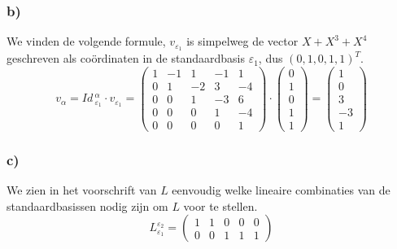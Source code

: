 \documentclass[lineaire_algebra_oplossingen.tex]{subfiles}
\begin{document}
\subsubsection*{b)}
We vinden de volgende formule, $v_{\varepsilon_1}$ is simpelweg de vector $X+X^3+X^4$ geschreven als co\"ordinaten in de standaardbasis $\varepsilon_1$, dus $(0,1,0,1,1)^T$.
\[
v_\alpha = 
\textit{Id}\,_{\varepsilon_1}^\alpha \cdot v_{\varepsilon_1} =
\begin{pmatrix}
1 & -1 &  1 & -1 &  1 \\
0 &  1 & -2 &  3 & -4 \\
0 &  0 &  1 & -3 &  6 \\
0 &  0 &  0 &  1 & -4 \\
0 &  0 &  0 &  0 &  1
\end{pmatrix}
\cdot 
\begin{pmatrix}
0 \\
1 \\
0 \\
1 \\
1
\end{pmatrix}
=
\begin{pmatrix}
 1 \\
 0 \\
 3 \\
-3 \\
 1
\end{pmatrix}
\]

\subsubsection*{c)}
We zien in het voorschrift van $L$ eenvoudig welke lineaire combinaties van de standaardbasissen nodig zijn om $L$ voor te stellen.
\[
L_{\varepsilon_1}^{\varepsilon_2}=
\begin{pmatrix}
1 & 1 & 0 & 0 & 0\\
0 & 0 & 1 & 1 & 1
\end{pmatrix}
\]
\end{document}
